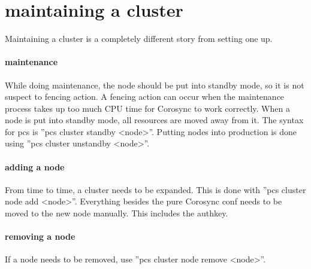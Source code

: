\section{maintaining a cluster}
Maintaining a cluster is a completely different story from setting one up.
\paragraph{maintenance}
While doing maintenance, the node should be put into standby mode, so it is not suspect
to fencing action. A fencing action can occur when the maintenance process
takes up too much CPU time for Corosync to work correctly.
When a node is put into standby mode, all resources are moved away from it.
The syntax for pcs is ''pcs cluster standby <node>''. Putting nodes
into production is done using ''pcs cluster unstandby <node>''.
\paragraph{adding a node}
From time to time, a cluster needs to be expanded.
This is done with ''pcs cluster node add <node>''.
Everything besides the pure Corosync conf needs to be moved to the new
node manually. This includes the authkey.
\paragraph{removing a node}
If a node needs to be removed, use ''pcs cluster node remove <node>''.
